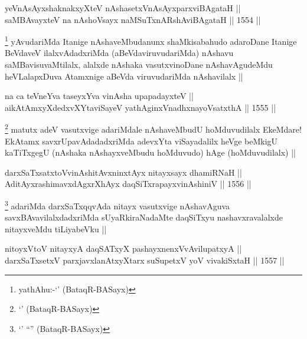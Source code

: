 
\begin{shl}
yeVnAsAyx\s \s shaknakxyXteV nAshasetxVnAsAyxparxviBAgataH || \\
saMBAvayxteV na nAshoV\s sayx naMSuTxnARshAviBAgataH ||  1554 ||  
\end{shl}

\begin{artha}
\footnote{yathAhu:-`\stext' (BataqR-BASayx)}
yAvudariMda Itanige nAshaveMbudanunx shaMkisabahudo adaroDane Itanige BeVdaveV ilalxvAdadxriMda (aBeVdaviruvudariMda) nAshavu saMBavisuvaMtilalx, alalxde nAshaka vasutxvinoDane nAshavAgudeMdu heVLalapxDuva Atamxnige aBeVda viruvudariMda nAshavilalx ||
\end{artha}


\begin{shl}
na ca teVneYva taseyxYva vinAsha upapadayxteV || \\
aikAtAmxyXdedxvXYtaviSayeV yathA\s ginxVnadhxnayoVsatxthA ||  1555 ||  
\end{shl}

\begin{artha}
\footnote{`\stext' (BataqR-BASayx)}
matutx adeV vasutxvige adariMdale nAshaveMbudU hoMduvudilalx EkeMdare! EkAtamx savxrUpavAdadadxriMda adevxYta viSayadalilx heVge beMkigU kaTiTxgegU (nAshaka nAshayxveMbudu hoMduvudo) hAge (hoMduvudilalx) ||
\end{artha}


\begin{shl}
darxSaTxsatxtoV\s vinAshitAvxninxtAyx nitayxsayx dhamiRNaH ||  \\
AditAyxrashimavxdAgxrXhAyx daqSiTxrapayxvinAshiniV ||  1556 ||  
\end{shl}

\begin{artha}
\footnote{`\stext' ``\stext'' (BataqR-BASayx)}
adariMda darxSaTxqqvAda nitayx vasutxvige nAshavAguva savxBAvavilalxdadxriMda sUyaRkiraNadaMte daqSiTxyu nashavxravalalxde nitayxveMdu tiLiyabeVku ||
\end{artha}


\begin{shl}
nitoyxV\s toV nitayxyA daqSATxyX pashayxnenxVvAvilupatxyA || \\
darxSaTx\s \s setxV parxjavxlanAtxyX\s tarx suSupetxV yoV vivakiSxtaH ||  1557 ||  
\end{shl}

